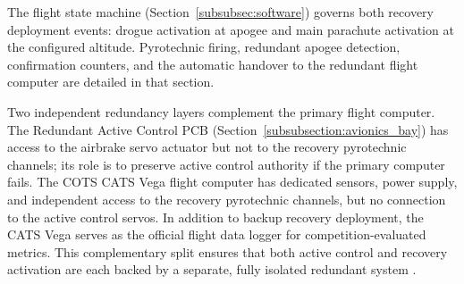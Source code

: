 
The flight state machine (Section~\ref{subsubsec:software}) governs both recovery deployment events: drogue activation at apogee and main parachute activation at the configured altitude. Pyrotechnic firing, redundant apogee detection, confirmation counters, and the automatic handover to the redundant flight computer are detailed in that section.

Two independent redundancy layers complement the primary flight computer. The Redundant Active Control PCB (Section~\ref{subsubsection:avionics_bay}) has access to the airbrake servo actuator but not to the recovery pyrotechnic channels; its role is to preserve active control authority if the primary computer fails. The COTS CATS Vega flight computer has dedicated sensors, power supply, and independent access to the recovery pyrotechnic channels, but no connection to the active control servos. In addition to backup recovery deployment, the CATS Vega serves as the official flight data logger for competition-evaluated metrics. This complementary split ensures that both active control and recovery activation are each backed by a separate, fully isolated redundant system .